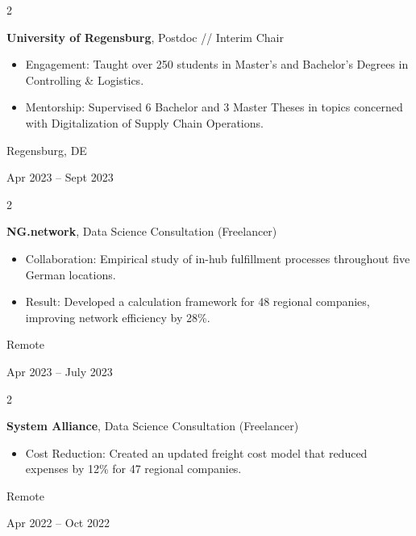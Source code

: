 \documentclass[10pt, a4paper]{article}
\newenvironment{highlights}{
    \begin{itemize}[
        topsep=0.10 cm,
        parsep=0.10 cm,
        partopsep=0pt,
        itemsep=0pt,
        leftmargin=0.4 cm + 10pt
    ]
}{
    \end{itemize}
} %
\newenvironment{twocolentry}[2][]{
    \onecolentry
    \def\secondColumn{#2}
    \setcolumnwidth{\fill, 4.5 cm}
    \begin{paracol}{2}
}{
    \switchcolumn \raggedleft \secondColumn
    \end{paracol}
    \endonecolentry
} %
\begin{document}
        \begin{twocolentry}{
            Regensburg, DE

        Apr 2023 – Sept 2023
        }
            \textbf{University of Regensburg}, Postdoc // Interim Chair
            \begin{highlights}
                \item Engagement: Taught over 250 students in Master's and Bachelor's Degrees in Controlling \& Logistics.
                \item Mentorship: Supervised 6 Bachelor and 3 Master Theses in topics concerned with Digitalization of Supply Chain Operations.
            \end{highlights}
        \end{twocolentry}


        \vspace{0.2 cm}

        \begin{twocolentry}{
            Remote

        Apr 2023 – July 2023
        }
            \textbf{NG.network}, Data Science Consultation (Freelancer)
            \begin{highlights}
                \item Collaboration: Empirical study of in-hub fulfillment processes throughout five German locations.
                \item Result: Developed a calculation framework for 48 regional companies, improving network efficiency by 28\%.
            \end{highlights}
        \end{twocolentry}


        \vspace{0.2 cm}

        \begin{twocolentry}{
            Remote

        Apr 2022 – Oct 2022
        }
            \textbf{System Alliance}, Data Science Consultation (Freelancer)
            \begin{highlights}
                \item Cost Reduction: Created an updated freight cost model that reduced expenses by 12\% for 47 regional companies.
            \end{highlights}
        \end{twocolentry}


        \vspace{0.2 cm}
\end{document}
